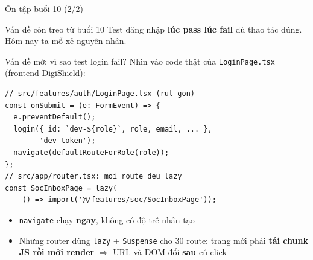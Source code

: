 \documentclass[aspectratio=169,12pt]{beamer}
\begin{document}
\begin{frame}{Ôn tập buổi 10 (2/2)}
  \begin{alertblock}{Vấn đề còn treo từ buổi 10}
    Test đăng nhập \textbf{lúc pass lúc fail} dù thao tác đúng.
    Hôm nay ta mổ xẻ nguyên nhân.
  \end{alertblock}
\end{frame}

\begin{frame}[fragile]{Vấn đề mở: vì sao test login fail?}
  Nhìn vào code thật của \texttt{LoginPage.tsx} (frontend DigiShield):

\begin{lstlisting}
// src/features/auth/LoginPage.tsx (rut gon)
const onSubmit = (e: FormEvent) => {
  e.preventDefault();
  login({ id: `dev-${role}`, role, email, ... },
        'dev-token');
  navigate(defaultRouteForRole(role));
};
// src/app/router.tsx: moi route deu lazy
const SocInboxPage = lazy(
    () => import('@/features/soc/SocInboxPage'));
\end{lstlisting}

  \begin{itemize}
    \item \texttt{navigate} chạy \textbf{ngay}, không có độ trễ nhân tạo
    \item Nhưng router dùng \texttt{lazy} + \texttt{Suspense} cho
          \alert{30 route}: trang mới phải \textbf{tải chunk JS rồi mới
          render} $\Rightarrow$ URL và DOM đổi \textbf{sau} cú click
  \end{itemize}
\end{frame}
\end{document}
